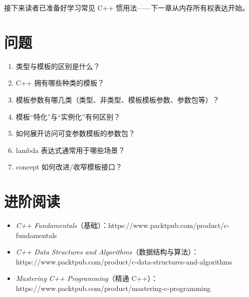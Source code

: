接下来读者已准备好学习常见 C++ 惯用法——下一章从内存所有权表达开始。

\section{问题}

\begin{enumerate}
\item
  类型与模板的区别是什么？
\item
  C++ 拥有哪些种类的模板？
\item
  模板参数有哪几类（类型、非类型、模板模板参数、参数包等）？
\item
  模板“特化”与“实例化”有何区别？
\item
  如何展开访问可变参数模板的参数包？
\item
  lambda 表达式通常用于哪些场景？
\item
  concept 如何改进/收窄模板接口？
\end{enumerate}

\section{进阶阅读}

\begin{itemize}
\item
  \emph{C++ Fundamentals}（基础）：https://www.packtpub.com/product/c-fundamentals
\item
  \emph{C++ Data Structures and Algorithms}（数据结构与算法）：https://www.packtpub.com/product/c-data-structures-and-algorithms
\item
  \emph{Mastering C++ Programming}（精通 C++）：https://www.packtpub.com/product/mastering-c-programming
\end{itemize}

